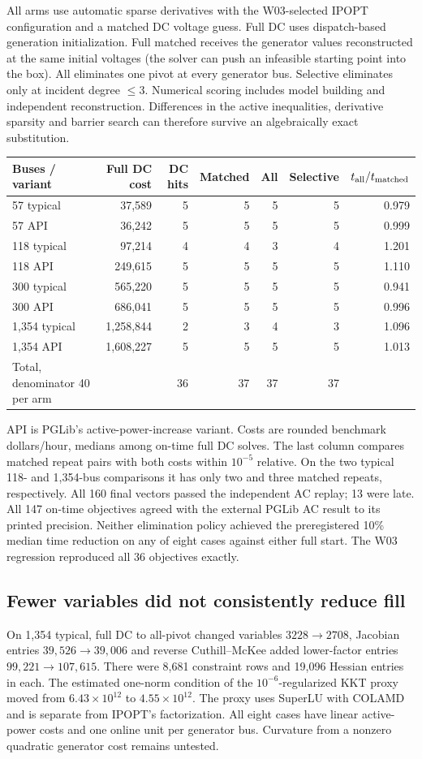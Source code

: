 \documentclass[10pt,letterpaper]{article}
\newcommand{\sub}[1]{\subsection*{\color{accent}#1}}
\begin{document}
All arms use automatic sparse derivatives with the W03-selected IPOPT configuration and a matched DC voltage guess. Full DC uses dispatch-based generation initialization. Full matched receives the generator values reconstructed at the same initial voltages (the solver can push an infeasible starting point into the box). All eliminates one pivot at every generator bus. Selective eliminates only at incident degree $\le3$. Numerical scoring includes model building and independent reconstruction. Differences in the active inequalities, derivative sparsity and barrier search can therefore survive an algebraically exact substitution.
\begin{center}\small
\begin{tabular}{@{}lr@{\quad}rrrrr@{}}
\toprule
Buses / variant & Full DC cost & DC hits & Matched & All & Selective & $t_{\rm all}/t_{\rm matched}$\\\midrule
57 typical & 37,589 &5&5&5&5&0.979\\
57 API & 36,242 &5&5&5&5&0.999\\
118 typical & 97,214 &4&4&3&4&1.201\\
118 API & 249,615 &5&5&5&5&1.110\\
300 typical & 565,220 &5&5&5&5&0.941\\
300 API & 686,041 &5&5&5&5&0.996\\
1,354 typical & 1,258,844 &2&3&4&3&1.096\\
1,354 API & 1,608,227 &5&5&5&5&1.013\\\midrule
Total, denominator 40 per arm &&36&37&37&37&\\\bottomrule
\end{tabular}
\end{center}
API is PGLib's active-power-increase variant. Costs are rounded benchmark dollars/hour, medians among on-time full DC solves. The last column compares matched repeat pairs with both costs within $10^{-5}$ relative. On the two typical 118- and 1,354-bus comparisons it has only two and three matched repeats, respectively. All 160 final vectors passed the independent AC replay; 13 were late. All 147 on-time objectives agreed with the external PGLib AC result to its printed precision. Neither elimination policy achieved the preregistered 10\% median time reduction on any of eight cases against either full start. The W03 regression reproduced all 36 objectives exactly.

\sub{Fewer variables did not consistently reduce fill}
On 1,354 typical, full DC to all-pivot changed variables $3228\to2708$, Jacobian entries $39{,}526\to39{,}006$ and reverse Cuthill--McKee added lower-factor entries $99{,}221\to107{,}615$. There were 8,681 constraint rows and 19,096 Hessian entries in each. The estimated one-norm condition of the $10^{-6}$-regularized KKT proxy moved from $6.43\times10^{12}$ to $4.55\times10^{12}$. The proxy uses SuperLU with COLAMD and is separate from IPOPT's factorization. All eight cases have linear active-power costs and one online unit per generator bus. Curvature from a nonzero quadratic generator cost remains untested.
\end{document}
